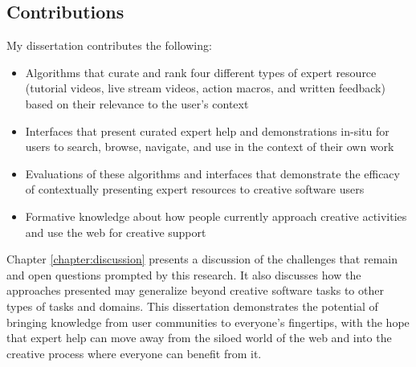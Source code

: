 \subsection{Contributions}
My dissertation contributes the following:
\begin{itemize}
\item Algorithms that curate and rank four different types of expert resource (tutorial videos, live stream videos, action macros, and written feedback) based on their relevance to the user's context
\item Interfaces that present curated expert help and demonstrations in-situ for users to search, browse, navigate, and use in the context of their own work
\item Evaluations of these algorithms and interfaces that demonstrate the efficacy of contextually presenting expert resources to creative software users
\item Formative knowledge about how people currently approach creative activities and use the web for creative support
\end{itemize}

Chapter \ref{chapter:discussion} presents a discussion of the challenges that remain and open questions prompted by this research. It also discusses how the approaches presented may generalize beyond creative software tasks to other types of tasks and domains. This dissertation demonstrates the potential of bringing knowledge from user communities to everyone's fingertips, with the hope that expert help can move away from the siloed world of the web and into the creative process where everyone can benefit from it.
